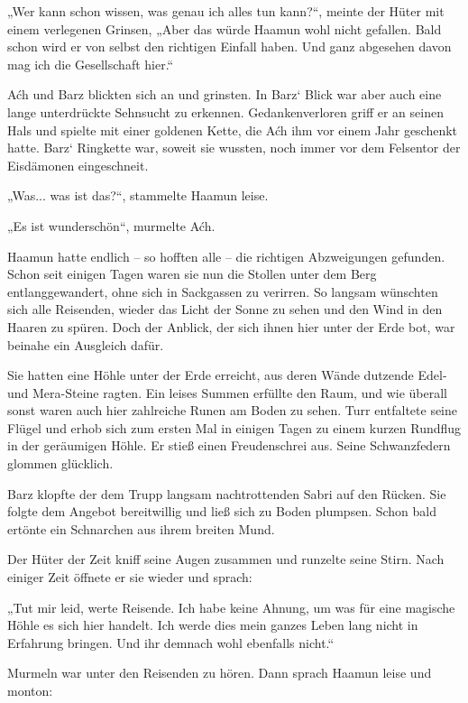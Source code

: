 „Wer kann schon wissen, was genau ich alles tun kann?“, meinte der Hüter mit einem verlegenen Grinsen, „Aber das würde Haamun wohl nicht gefallen. Bald schon wird er von selbst den richtigen Einfall haben. Und ganz abgesehen davon mag ich die Gesellschaft hier.“

Aćh und Barz blickten sich an und grinsten. In Barz‘ Blick war aber auch eine lange unterdrückte Sehnsucht zu erkennen. Gedankenverloren griff er an seinen Hals und spielte mit einer goldenen Kette, die Aćh ihm vor einem Jahr geschenkt hatte. Barz‘ Ringkette war, soweit sie wussten, noch immer vor dem Felsentor der Eisdämonen eingeschneit.\bigskip







„Was... was ist das?“, stammelte Haamun leise.

„Es ist wunderschön“, murmelte Aćh.

Haamun hatte endlich – so hofften alle – die richtigen Abzweigungen gefunden. Schon seit einigen Tagen waren sie nun die Stollen unter dem Berg entlanggewandert, ohne sich in Sackgassen zu verirren. So langsam wünschten sich alle Reisenden, wieder das Licht der Sonne zu sehen und den Wind in den Haaren zu spüren. Doch der Anblick, der sich ihnen hier unter der Erde bot, war beinahe ein Ausgleich dafür.

Sie hatten eine Höhle unter der Erde erreicht, aus deren Wände dutzende Edel- und Mera-Steine ragten. Ein leises Summen erfüllte den Raum, und wie überall sonst waren auch hier zahlreiche Runen am Boden zu sehen. Turr entfaltete seine Flügel und erhob sich zum ersten Mal in einigen Tagen zu einem kurzen Rundflug in der geräumigen Höhle. Er stieß einen Freudenschrei aus. Seine Schwanzfedern glommen glücklich.

Barz klopfte der dem Trupp langsam nachtrottenden Sabri auf den Rücken. Sie folgte dem Angebot bereitwillig und ließ sich zu Boden plumpsen. Schon bald ertönte ein Schnarchen aus ihrem breiten Mund.

Der Hüter der Zeit kniff seine Augen zusammen und runzelte seine Stirn. Nach einiger Zeit öffnete er sie wieder und sprach:

„Tut mir leid, werte Reisende. Ich habe keine Ahnung, um was für eine magische Höhle es sich hier handelt. Ich werde dies mein ganzes Leben lang nicht in Erfahrung bringen. Und ihr demnach wohl ebenfalls nicht.“

Murmeln war unter den Reisenden zu hören. Dann sprach Haamun leise und monton:

